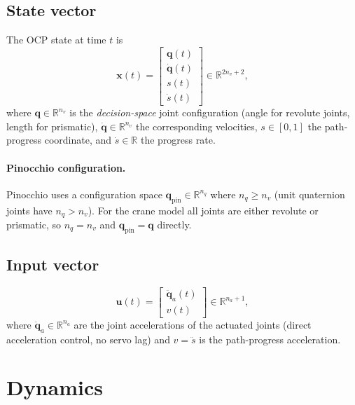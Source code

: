 \documentclass[11pt, a4paper]{article}
\newcommand{\R}{\mathbb{R}}
\newcommand{\qd}{\bm{q}}          %
\newcommand{\dqd}{\dot{\bm{q}}}   %
\begin{document}
\subsection{State vector}

The OCP state at time $t$ is
\begin{equation}
  \bm{x}(t) =
  \begin{bmatrix}
    \qd(t) \\ \dqd(t) \\ s(t) \\ \dot{s}(t)
  \end{bmatrix}
  \in \R^{2n_v + 2},
\end{equation}
where $\qd \in \R^{n_v}$ is the \emph{decision-space} joint configuration (angle for
revolute joints, length for prismatic), $\dqd \in \R^{n_v}$ the corresponding
velocities, $s \in [0,1]$ the path-progress coordinate, and $\dot{s} \in \R$ the
progress rate.

\paragraph{Pinocchio configuration.}
Pinocchio uses a configuration space $\bm{q}_\mathrm{pin} \in \R^{n_q}$ where
$n_q \geq n_v$ (unit quaternion joints have $n_q > n_v$). For the crane model all
joints are either revolute or prismatic, so $n_q = n_v$ and $\bm{q}_\mathrm{pin} =
\qd$ directly.

\subsection{Input vector}

\begin{equation}
  \bm{u}(t) =
  \begin{bmatrix}
    \ddot{\bm{q}}_a(t) \\ v(t)
  \end{bmatrix}
  \in \R^{n_a + 1},
\end{equation}
where $\ddot{\bm{q}}_a \in \R^{n_a}$ are the joint accelerations of the actuated joints
(direct acceleration control, no servo lag) and $v = \ddot{s}$ is the path-progress
acceleration.

\section{Dynamics}
\end{document}
